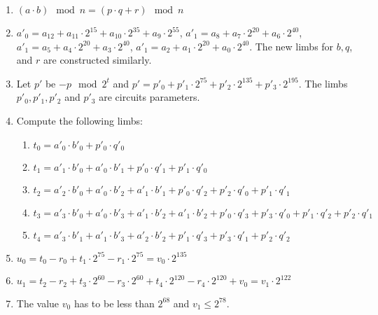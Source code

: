 \begin{enumerate}
\item $(a\cdot b) \mod n = (p \cdot q + r) \mod n$
\item $a'_0 = a_{12} + a_{11} \cdot 2^{15} + a_{10} \cdot 2^{35} + a_9 \cdot 2^{55}$, $a'_1 = a_8 + a_7 \cdot 2^{20} + a_6 \cdot 2^{40}$, $a'_1 = a_5 + a_4 \cdot 2^{20} + a_3 \cdot 2^{40}$, $a'_1 = a_2 + a_1 \cdot 2^{20} + a_0 \cdot 2^{40}$.
The new limbs for  $b, q$, and $r$ are constructed similarly.
\item Let $p'$ be $-p \mod 2^t$ and $p' = p'_{0} + p'_{1}\cdot 2^{75} + p'_2 \cdot 2^{135}+ p'_3 \cdot 2^{195}$. The limbs $p'_0, p'_1, p'_2$ and $p'_3$ are circuits parameters.
\item Compute the following limbs:
	\begin{enumerate}
	\item $t_0 = a'_0 \cdot b'_0 + p'_0 \cdot q'_0$
	\item $t_1 = a'_1 \cdot b'_0 + a'_0 \cdot b'_1 + p'_0 \cdot q'_1 + p'_1 \cdot q'_0$
	\item $t_2 = a'_2 \cdot b'_0 + a'_0 \cdot b'_2 + a'_1 \cdot b'_1 + p'_0 \cdot q'_2 + p'_2 \cdot q'_0+ p'_1 		\cdot q'_1$
	\item $t_3 = a'_3 \cdot b'_0 + a'_0 \cdot b'_3 + a'_1 \cdot b'_2 + a'_1 \cdot b'_2 + p'_0 \cdot q'_3 + p'_3 	\cdot q'_0+ p'_1 \cdot q'_2 + p'_2 \cdot q'_1$
	\item $t_4 = a'_3 \cdot b'_1 + a'_1 \cdot b'_3 + a'_2 \cdot b'_2 + p'_1 \cdot q'_3 + p'_3 \cdot q'_1+ p'_2 			\cdot q'_2$
	\end{enumerate}
\item $u_0 = t_0 - r_0 + t_1 \cdot 2^{75} - r_1 \cdot 2^{75} = v_0 \cdot 2^{135}$
\item $u_1 = t_2 - r_2 + t_3 \cdot 2^{60} - r_3 \cdot 2^{60} + t_4 \cdot 2^{120} - r_4 \cdot 2^{120} + v_0 = v_1 \cdot 2^{122}$
\item The value $v_0$ has to be less than $2^{68}$ and $v_1 \le 2^{78}$.
\end{enumerate}


